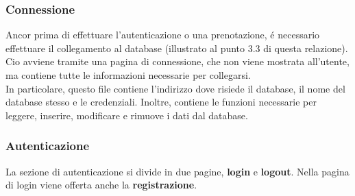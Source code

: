 \documentclass{article}
\begin{document}
\subsubsection{Connessione}
Ancor prima di effettuare l'autenticazione o una prenotazione, é necessario effettuare il collegamento al database (illustrato al punto 3.3 di questa relazione).\\
Cio avviene tramite una pagina di connessione, che non viene mostrata all'utente, ma contiene tutte le informazioni necessarie per collegarsi.\\
In particolare, questo file contiene l'indirizzo dove risiede il database, il nome del database stesso e le credenziali. Inoltre, contiene le funzioni necessarie per leggere, inserire, modificare e rimuove i dati dal database.
\subsubsection{Autenticazione}
La sezione di autenticazione si divide in due pagine, \textbf{login} e \textbf{logout}. Nella pagina di login viene offerta anche la \textbf{registrazione}.
\end{document}
